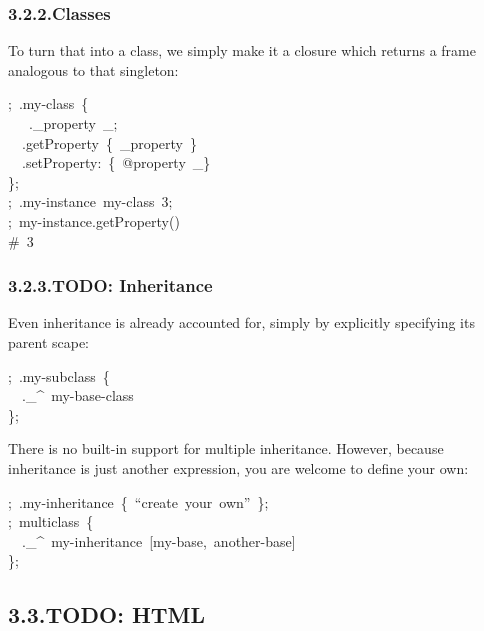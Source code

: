 \documentclass[preprint]{{acmart}}
\begin{document}
\subsubsection{3.2.2.\hspace*{0.5em}Classes}\label{sec-classes}%

\noindent{}To turn that into a class, we simply make it a closure which returns
a frame analogous to that singleton:%
\begin{mdpre}%
\noindent;~.my-{class}~\{\\
~~~.\_property~\_;\\
~~.getProperty~\{~\_property~\}\\
~~.setProperty{:}~\{~{@property}~\_\}\\
\};\\
;~.my-instance~my-{class}~3;\\
;~my-instance.getProperty()\\
{\#~3}%
\end{mdpre}
\subsubsection{3.2.3.\hspace*{0.5em}TODO: Inheritance}\label{sec-todo--inheritance}%

\noindent{}Even inheritance is already accounted for, simply by explicitly specifying
its parent scape:%
\begin{mdpre}%
\noindent;~.my-subclass~\{\\
~~.\_\textasciicircum{}~my-base-{class}\\
\};%
\end{mdpre}\noindent{}There is no built-in support for multiple inheritance.  However, because
inheritance is just another expression, you are welcome to define your own:
\begin{mdpre}%
\noindent;~.my-inheritance~\{~“create~your~own”~\};\\
;~multiclass~\{\\
~~.\_\textasciicircum{}~my-inheritance~{}[my-base,~another-base]\\
\};%
\end{mdpre}
\subsection{3.3.\hspace*{0.5em}TODO: HTML}\label{sec-maml}%
\end{document}
